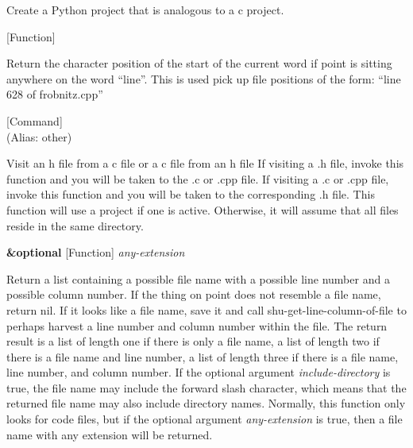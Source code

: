 \begin{doc-string}
Create a Python project that is analogous to a c project.
\end{doc-string}

\vspace{1em}
\noindent
{}
\usebox{\funcname}
 \hfill [Function]

\begin{doc-string}
Return the character position of the start of the current word if point is sitting
anywhere on the word ``line''.  This is used pick up file positions of the form:
``line 628 of frobnitz.cpp''
\end{doc-string}

\vspace{1em}
\noindent
{}
\usebox{\funcname}
 \hfill [Command]\\%
 (Alias: other)

\begin{doc-string}
Visit an h file from a c file or a c file from an h file If visiting a .h
file, invoke this function and you will be taken to the .c or .cpp file.  If
visiting a .c or .cpp file, invoke this function and you will be taken to the
corresponding .h file.  This function will use a project if one is active.
Otherwise, it will assume that all files reside in the same directory.
\end{doc-string}

\vspace{1em}
\noindent
{}
\usebox{\funcname}\textbf{\&optional}
 \hfill [Function]
\hspace*{\wd\funcname}\emph{any-extension}

\begin{doc-string}
Return a list containing a possible file name with a possible line number
and a possible column number.  If the thing on point does not resemble a file
name, return nil.  If it looks like a file name, save it and call
shu-get-line-column-of-file to perhaps harvest a line number and column number
within the file.  The return result is a list of length one if there is only
a file name, a list of length two if there is a file name and line number, a
list of length three if there is a file name, line number, and column number.
If the optional argument \emph{include-directory} is true, the file name may include
the forward slash character, which means that the returned file name may also
include directory names.  Normally, this function only looks for code files,
but if the optional argument \emph{any-extension} is true, then a file name with any
extension will be returned.
\end{doc-string}

